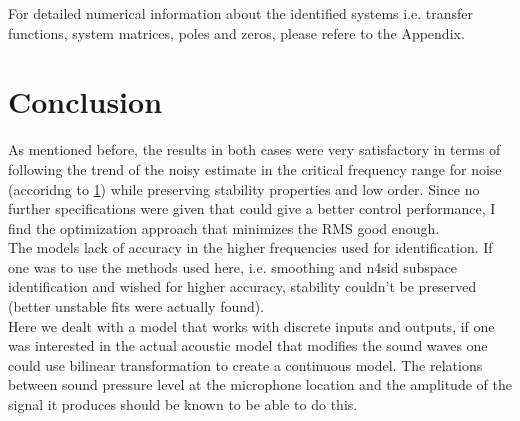 For detailed numerical information about the identified systems i.e. transfer functions, system matrices, poles and zeros, please refere to the Appendix.

\section{Conclusion}

As mentioned before, the results in both cases were very satisfactory in terms of following the trend of the noisy estimate in the critical frequency range for noise (accoridng to \ref{}) while preserving stability properties and low order. Since no further specifications were given that could give a better control performance, I find the optimization approach that minimizes the RMS good enough.\\

The models lack of accuracy in the higher frequencies used for identification. If one was to use the methods used here, i.e. smoothing and n4sid subspace identification and wished for higher accuracy, stability couldn't be preserved (better unstable fits were actually found).\\

Here we dealt with a model that works with discrete inputs and outputs, if one was interested in the actual acoustic model that modifies the sound waves one could use bilinear transformation to create a continuous model. The relations between sound pressure level at the microphone location and the amplitude of the signal it produces should be known to be able to do this.

